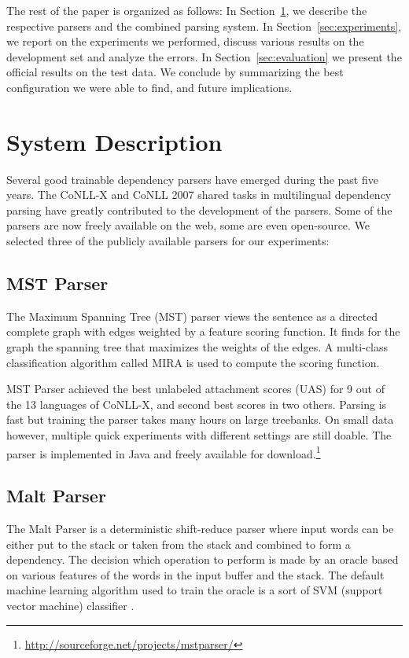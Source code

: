 \documentclass[11pt]{article}
\def\Sref#1{Section~\ref{#1}}
\def\microsection#1{{\bf #1.}}
\begin{document}
The rest of the paper is organized as follows: In \Sref{sec:system}, we describe the respective parsers and the combined parsing system. In \Sref{sec:experiments}, we report on the experiments we performed, discuss various results on the development set and analyze the errors. In \Sref{sec:evaluation} we present the official results on the test data. We conclude by summarizing the best configuration we were able to find, and future implications.

\section{System Description}
\label{sec:system}

Several good trainable dependency parsers have emerged during the past five years. The CoNLL-X \citep{buchholz-marsi:2006:CoNLL-X} and CoNLL 2007 \citep{nivre-EtAl:2007:EMNLP-CoNLL2007} shared tasks in multilingual dependency parsing have greatly contributed to the development of the parsers. Some of the parsers are now freely available on the web, some are even open-source. We selected three of the publicly available parsers for our experiments:

\subsection{MST Parser}
\label{sec:mst}
The Maximum Spanning Tree (MST) parser \citep{mst} views the sentence as a directed complete graph with edges weighted by a feature scoring function. It finds for the graph the spanning tree that maximizes the weights of the edges. A multi-class classification algorithm called MIRA is used to compute the scoring function.

MST Parser achieved the best unlabeled attachment scores (UAS) for 9 out of the 13 languages of CoNLL-X, and second best scores in two others. Parsing is fast but training the parser takes many hours on large treebanks. On small data however, multiple quick experiments with different settings are still doable. The parser is implemented in Java and freely available for download.\footnote{\url{http://sourceforge.net/projects/mstparser/}}

\subsection{Malt Parser}
\label{sec:malt}
The Malt Parser  \citep{malt} is a deterministic shift-reduce parser where input words can be either put to the stack or taken from the stack and combined to form a dependency. The decision which operation to perform is made by an oracle based on various features of the words in the input buffer and the stack. The default machine learning algorithm used to train the oracle is a sort of SVM (support vector machine) classifier \citep{svm}.
\end{document}
